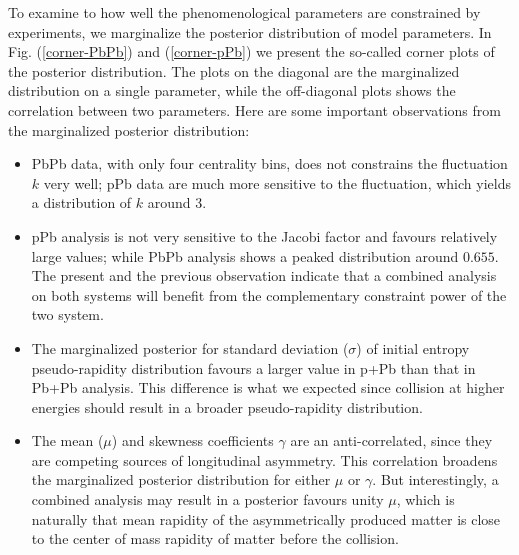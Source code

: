 \documentclass[aps,prl,twocolumn,groupedaddress]{revtex4-1}
\begin{document}
	To examine to how well the phenomenological parameters are constrained by experiments, we marginalize the posterior distribution of model parameters. 
	In Fig. (\ref{corner-PbPb}) and (\ref{corner-pPb}) we present the so-called corner plots of the posterior distribution. 
	The plots on the diagonal are the marginalized distribution on a single parameter, while the off-diagonal plots shows the correlation between two parameters. 
	Here are some important observations from the marginalized  posterior distribution:
	\begin{itemize}
	\item PbPb data, with only four centrality bins, does not constrains the fluctuation $k$ very well; pPb data are much more sensitive to the fluctuation, which yields a distribution of $k$ around 3.
	\item pPb analysis is not very sensitive to the Jacobi factor and favours relatively large values; while PbPb analysis shows a peaked distribution around $0.655$. 
	The present and the previous observation indicate that a combined analysis on both systems will benefit from the complementary constraint power of the two system.
	\item The marginalized posterior for standard deviation ($\sigma$) of initial entropy pseudo-rapidity distribution favours a larger value in p+Pb than that in Pb+Pb analysis. 
	This difference is what we expected since collision at higher energies should result in a broader pseudo-rapidity distribution. 
	\item  The mean ($\mu$) and skewness coefficients $\gamma$ are an anti-correlated, since they are competing sources of longitudinal asymmetry. 
	This correlation broadens the marginalized posterior distribution for either $\mu$ or $\gamma$. 
	But interestingly, a combined analysis may result in a posterior favours unity $\mu$, which is naturally that mean rapidity of the asymmetrically produced matter is close to the center of mass rapidity of matter before the collision.
	\end{itemize}
	
\end{document}
